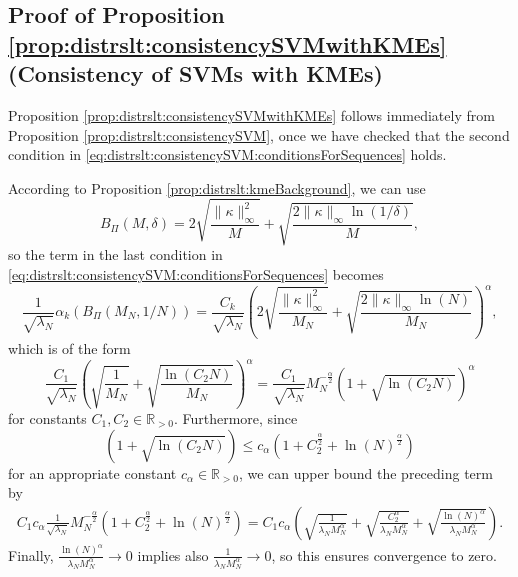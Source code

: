 \documentclass[letterpaper]{article} %
\newcommand{\R}{\mathbb{R}}
\newcommand{\Rp}{\R_{> 0}}
\newcommand{\hilbertianEmbed}{\Pi} %
\newcommand{\kKME}{\kappa} %
\newcommand{\hilbertianEmbedBound}{B_\hilbertianEmbed} %
\begin{document}
\subsection{Proof of Proposition \ref{prop:distrslt:consistencySVMwithKMEs} (Consistency of SVMs with KMEs)} \label{sec:distrslt:proofOfonsistencySVMwithKMEs}
Proposition \ref{prop:distrslt:consistencySVMwithKMEs} follows immediately from Proposition \ref{prop:distrslt:consistencySVM},
once we have checked that the second condition in \eqref{eq:distrslt:consistencySVM:conditionsForSequences} holds.

According to Proposition \ref{prop:distrslt:kmeBackground}, we can use
\begin{equation*}
    \hilbertianEmbedBound(M,\delta) = 2\sqrt{\frac{\|\kKME\|_\infty^2}{M}} + \sqrt{\frac{2\|\kKME\|_\infty \ln(1/\delta)}{M}},
\end{equation*}
so the term in the last condition in \eqref{eq:distrslt:consistencySVM:conditionsForSequences} becomes
\begin{equation*}
     \frac{1}{\sqrt{\lambda_N}} \alpha_k(\hilbertianEmbedBound(M_N,1/N)) 
    = 
    \frac{C_k}{\sqrt{\lambda_N}}\left(2\sqrt{\frac{\|\kKME\|_\infty^2}{M_N}} + \sqrt{\frac{2\|\kKME\|_\infty \ln(N)}{M_N}}\right)^\alpha,
\end{equation*}
which is of the form
\begin{equation*}
    \frac{C_1}{\sqrt{\lambda_N}} \left(\sqrt{\frac{1}{M_N}} + \sqrt{\frac{\ln(C_2 N)}{M_N}}\right)^\alpha
    =
    \frac{C_1}{\sqrt{\lambda_N}} M_N^{-\frac{\alpha}{2}}\left(1 + \sqrt{\ln(C_2 N)}\right)^\alpha
\end{equation*}
for constants $C_1,C_2\in\Rp$.
Furthermore, since
\begin{equation*}
    \left(1 + \sqrt{\ln(C_2 N)}\right) \leq c_\alpha(1 + C_2^{\frac{\alpha}{2}} + \ln(N)^{\frac{\alpha}{2}})
\end{equation*}
for an appropriate constant $c_\alpha\in\Rp$,
we can upper bound the preceding term by
\begin{align*}
      C_1 c_\alpha 
        \frac{1}{\sqrt{\lambda_N}} M_N^{-\frac{\alpha}{2}}\left(1 + C_2^{\frac{\alpha}{2}} + \ln(N)^{\frac{\alpha}{2}}\right) 
     =
     C_1 c_\alpha \left(
        \sqrt{\frac{1}{\lambda_N M_N^\alpha}}
        + 
        \sqrt{\frac{C_2^\alpha}{\lambda_N M_N^\alpha}}
        +
        \sqrt{\frac{\ln(N)^\alpha}{\lambda_N M_N^\alpha}} \right).
\end{align*}
Finally, $\frac{\ln(N)^\alpha}{\lambda_N M_N^\alpha} \rightarrow 0$ implies also $\frac{1}{\lambda_N M_N^\alpha} \rightarrow 0$, so this ensures convergence to zero.
\end{document}
